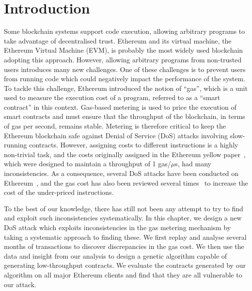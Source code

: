 \section{Introduction}
\label{sec:3:introduction}

Some blockchain systems support code execution, allowing arbitrary programs to take advantage of decentralised trust.
Ethereum and its virtual machine, the Ethereum Virtual Machine (EVM), is probably the most widely used blockchain adopting this approach.
However, allowing arbitrary programs from non-trusted users introduces many new challenges.
One of these challenges is to prevent users from running code which could negatively impact the performance of the system.
To tackle this challenge, Ethereum introduced the notion of ``gas'', which is a unit used to measure the execution cost of a program, referred to as a ``smart contract'' in this context.
Gas-based metering is used to price the execution of smart contracts and must ensure that the throughput of the blockchain, in terms of gas per second, remains stable.
Metering is therefore critical to keep the Ethereum blockchain safe against Denial of Service (DoS) attacks involving slow-running contracts.
However, assigning costs to different instructions is a highly non-trivial task, and the costs originally assigned in the Ethereum yellow paper~\cite{wood2014ethereum}, which were designed to maintain a throughput of 1 gas/$\mu$s, had many inconsistencies.
As a consequence, several DoS attacks have been conducted on Ethereum~\cite{transaction-spam-attack,suicide-attack}, and the gas cost has also been reviewed several times~\cite{erc150,eip-1884} to increase the cost of the under-priced instructions.

To the best of our knowledge, there has still not been any attempt to try to find and exploit such inconsistencies systematically.
In this chapter, we design a new DoS attack which exploits inconsistencies in the gas metering mechanism by taking a systematic approach to finding these.
We first replay and analyse several months of transactions to discover discrepancies in the gas cost.
We then use the data and insight from our analysis to design a genetic algorithm capable of generating low-throughput contracts.
We evaluate the contracts generated by our algorithm on all major Ethereum clients and find that they are all vulnerable to our attack.

